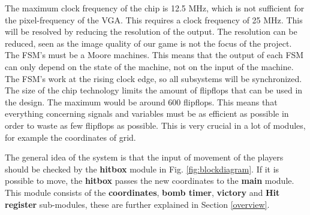 The maximum clock frequency of the chip is 12.5 MHz, which is not sufficient for the pixel-frequency of the VGA. This requires a clock frequency of 25 MHz. This will be resolved by reducing the resolution of the output. The resolution can be reduced, seen as the image quality of our game is not the focus of the project.\\

The FSM's must be a Moore machines. This means that the output of each FSM can only depend on the state of the machine, not on the input of the machine. The FSM's work at the rising clock edge, so all subsystems will be synchronized. \\

The size of the chip technology limits the amount of flipflops that can be used in the design. The maximum would be around 600 flipflops. This means that everything concerning signals and variables must be as efficient as possible in order to waste as few flipflops as possible. This is very crucial in a lot of modules, for example the coordinates of grid.

The general idea of the system is that the input of movement of the players should be checked by the \textbf{hitbox} module in Fig. \ref{fig:blockdiagram}. If it is possible to move, the \textbf{hitbox} passes the new coordinates to the \textbf{main} module. This module consists of the \textbf{coordinates}, \textbf{bomb timer}, \textbf{victory} and \textbf{Hit register} sub-modules, these are further explained in Section \ref{overview}. 